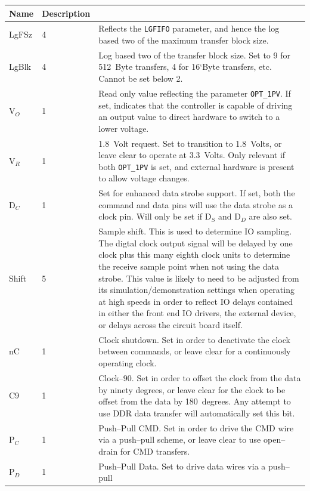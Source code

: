 \documentclass{gqtekspec}
\begin{document}
\begin{table}\begin{center}
\begin{tabular}{|p{1.2in}|p{0.5in}|p{4.0in}|}\hline
	\rowcolor[gray]{0.85} Name & Description\\\hline\hline
LgFSz & 4 & Reflects the {\tt LGFIFO} parameter, and hence the log based two
	of the maximum transfer block size. \\
LgBlk & 4 & Log based two of the transfer block size.  Set to 9 for 512~Byte
	transfers, 4 for 16`Byte transfers, etc.  Cannot be set below 2.\\
%
V$_O$ & 1 & Read only value reflecting the parameter {\tt OPT\_1PV}.  If set,
	indicates that the controller is capable of driving an output value
	to direct hardware to switch to a lower voltage.\\
V$_R$ & 1 & 1.8~Volt request.  Set to transition to 1.8~Volts, or leave clear
	to operate at 3.3~Volts.  Only relevant if both {\tt OPT\_1PV} is set,
	and external hardware is present to allow voltage changes.\\
D$_C$ & 1 & Set for enhanced data strobe support.  If set, both the command
	and data pins will use the data strobe as a clock pin.  Will only
	be set if D$_S$ and D$_D$ are also set.
	\\
Shift & 5 & Sample shift.  This is used to determine IO sampling.  The digtal
	clock output signal will be delayed by one clock plus this many
	eighth clock units to determine the receive sample point when not
	using the data strobe.  This value is likely to need to be adjusted
	from its simulation/demonstration settings when operating at high speeds
	in order to reflect IO delays contained in either the front end IO
	drivers, the external device, or delays across the circuit board
	itself. \\
%
nC & 1 & Clock shutdown.  Set in order to deactivate the clock between commands,
	or leave clear for a continuously operating clock.\\
C9 & 1 & Clock--90.  Set in order to offset the clock from the data by
	ninety degrees, or leave clear for the clock to be offset from the
	data by 180~degrees.  Any attempt to use DDR data transfer will
	automatically set this bit.\\
P$_C$ & 1 & Push--Pull CMD.  Set in order to drive the CMD wire via a
	push--pull scheme, or leave clear to use open--drain for CMD transfers.
	\\
P$_D$ & 1 & Push--Pull Data.  Set to drive data wires via a push--pull

\end{tabular}
\end{center}
\end{table}
\end{document}
